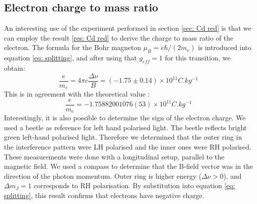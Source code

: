 \documentclass[11pt]{article}
\begin{document}
\subsection{Electron charge to mass ratio} \label{sec: e/m ratio}
An interesting use of the experiment performed in section \ref{sec: Cd red} is that we can employ the result \eqref{res: Cd red} to derive the charge to mass ratio of the electron. The formula for the Bohr magneton $\mu_B = e \hbar / (2 m_e)$ is introduced into equation \eqref{eq: splitting}, and after using that $g_{eff} = 1$ for this transition, we obtain: 
\begin{equation}
    \frac{e}{m_e} = 4 \pi c \frac{\Delta \nu}{B} = (-1.75 \pm 0.14) \times 10^{11} \si{C.kg^{-1}}
\end{equation}
This is in agreement with the theoretical value \cite{CODATA2018}: 
\begin{equation}
    \frac{e}{m_e} = -1.75882001076(53) \times 10^{11} \si{C.kg^{-1}}
\end{equation}
Interestingly, it is also possible to determine the sign of the electron charge. We used a beetle as reference for left hand polarised light. The beetle reflects bright green left-hand polarised light. Therefore we determined that the outer ring in the interference pattern were LH polarised and the inner ones were RH polarised. These measurements were done with a longitudinal setup, parallel to the magnetic field. We used a compass to determine that the B-field vector was in the direction of the photon momentum. Outer ring is higher energy ($\Delta \nu > 0$), and $ \Delta m_J = 1$ corresponds to RH polarisation. By substitution into equation \eqref{eq: splitting}, this result confirms that electrons have negative charge. 
\end{document}
